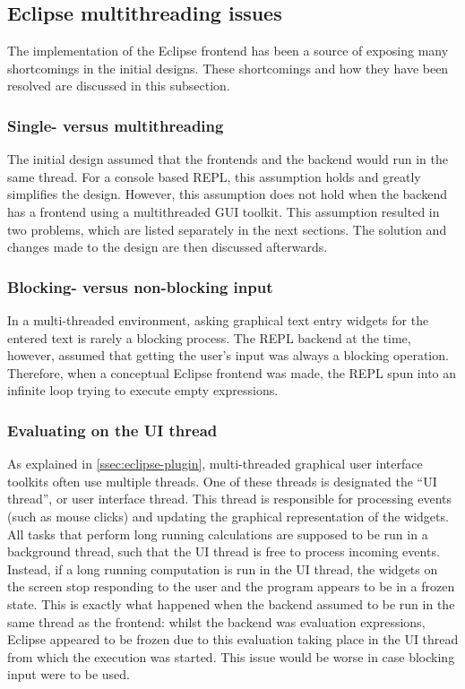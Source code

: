 \subsection{Eclipse multithreading issues}
\label{ssec:eclipse-multithread}

The implementation of the Eclipse frontend has been a source of exposing many
shortcomings in the initial designs. These shortcomings and how they have been
resolved are discussed in this subsection.

\subsubsection{Single- versus multithreading}
\label{ssec:threading}

The initial design assumed that the frontends and the backend would run in the
same thread. For a console based REPL, this assumption holds and greatly
simplifies the design. However, this assumption does not hold when the backend
has a frontend using a multithreaded GUI toolkit. This
assumption resulted in two problems, which are listed separately in the next
sections. The solution and changes made to the design are then discussed
afterwards.

\subsubsection{Blocking- versus non-blocking input}

In a multi-threaded environment, asking graphical text entry widgets for the
entered text is rarely a blocking process. The REPL backend at the time,
however, assumed that getting the user's input was always a blocking operation.
Therefore, when a conceptual Eclipse frontend was made, the REPL spun into an
infinite loop trying to execute empty expressions.

\subsubsection{Evaluating on the UI thread}

As explained in \cref{ssec:eclipse-plugin}, multi-threaded graphical user
interface toolkits often use multiple threads. One of these threads is
designated the ``UI thread'', or user interface thread. This thread is
responsible for processing events (such as mouse clicks) and updating the
graphical representation of the widgets. All tasks that perform long running
calculations are supposed to be run in a background thread, such that the UI
thread is free to process incoming events. Instead, if a long running
computation is run in the UI thread, the widgets on the screen stop responding
to the user and the program appears to be in a frozen state.  This is exactly
what happened when the backend assumed to be run in the same thread as the
frontend: whilst the backend was evaluation expressions, Eclipse appeared to be
frozen due to this evaluation taking place in the UI thread from which the
execution was started. This issue would be worse in case blocking input
were to be used.

